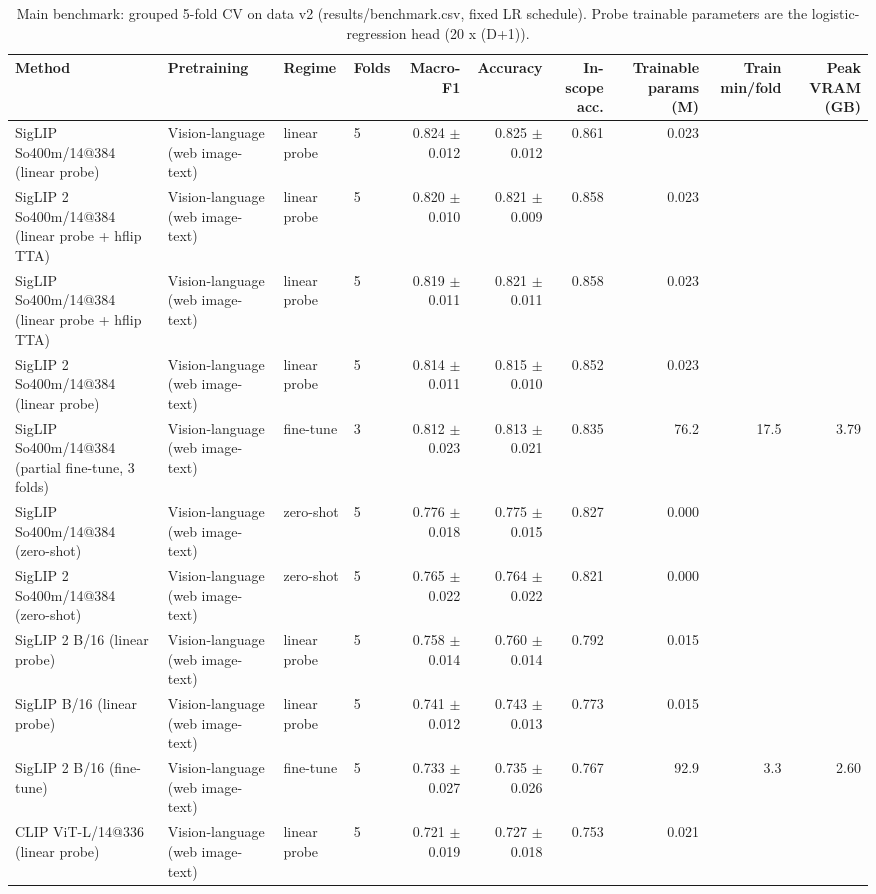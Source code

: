 \begin{table}[t]
\centering\small
\caption{Main benchmark: grouped 5-fold CV on data v2 (results/benchmark.csv, fixed LR schedule). Probe trainable parameters are the logistic-regression head (20 x (D+1)).}
\label{tab:benchmark_main}
\begin{tabular}{llllrrrrrr}
\toprule
Method & Pretraining & Regime & Folds & Macro-F1 & Accuracy & In-scope acc. & Trainable params (M) & Train min/fold & Peak VRAM (GB) \\
\midrule
SigLIP So400m/14@384 (linear probe) & Vision-language (web image-text) & linear probe & 5 & 0.824 $\pm$ 0.012 & 0.825 $\pm$ 0.012 & 0.861 & 0.023 &  &  \\
SigLIP 2 So400m/14@384 (linear probe + hflip TTA) & Vision-language (web image-text) & linear probe & 5 & 0.820 $\pm$ 0.010 & 0.821 $\pm$ 0.009 & 0.858 & 0.023 &  &  \\
SigLIP So400m/14@384 (linear probe + hflip TTA) & Vision-language (web image-text) & linear probe & 5 & 0.819 $\pm$ 0.011 & 0.821 $\pm$ 0.011 & 0.858 & 0.023 &  &  \\
SigLIP 2 So400m/14@384 (linear probe) & Vision-language (web image-text) & linear probe & 5 & 0.814 $\pm$ 0.011 & 0.815 $\pm$ 0.010 & 0.852 & 0.023 &  &  \\
SigLIP So400m/14@384 (partial fine-tune, 3 folds) & Vision-language (web image-text) & fine-tune & 3 & 0.812 $\pm$ 0.023 & 0.813 $\pm$ 0.021 & 0.835 & 76.2 & 17.5 & 3.79 \\
SigLIP So400m/14@384 (zero-shot) & Vision-language (web image-text) & zero-shot & 5 & 0.776 $\pm$ 0.018 & 0.775 $\pm$ 0.015 & 0.827 & 0.000 &  &  \\
SigLIP 2 So400m/14@384 (zero-shot) & Vision-language (web image-text) & zero-shot & 5 & 0.765 $\pm$ 0.022 & 0.764 $\pm$ 0.022 & 0.821 & 0.000 &  &  \\
SigLIP 2 B/16 (linear probe) & Vision-language (web image-text) & linear probe & 5 & 0.758 $\pm$ 0.014 & 0.760 $\pm$ 0.014 & 0.792 & 0.015 &  &  \\
SigLIP B/16 (linear probe) & Vision-language (web image-text) & linear probe & 5 & 0.741 $\pm$ 0.012 & 0.743 $\pm$ 0.013 & 0.773 & 0.015 &  &  \\
SigLIP 2 B/16 (fine-tune) & Vision-language (web image-text) & fine-tune & 5 & 0.733 $\pm$ 0.027 & 0.735 $\pm$ 0.026 & 0.767 & 92.9 & 3.3 & 2.60 \\
CLIP ViT-L/14@336 (linear probe) & Vision-language (web image-text) & linear probe & 5 & 0.721 $\pm$ 0.019 & 0.727 $\pm$ 0.018 & 0.753 & 0.021 &  &  \\

\end{tabular}
\end{table}
